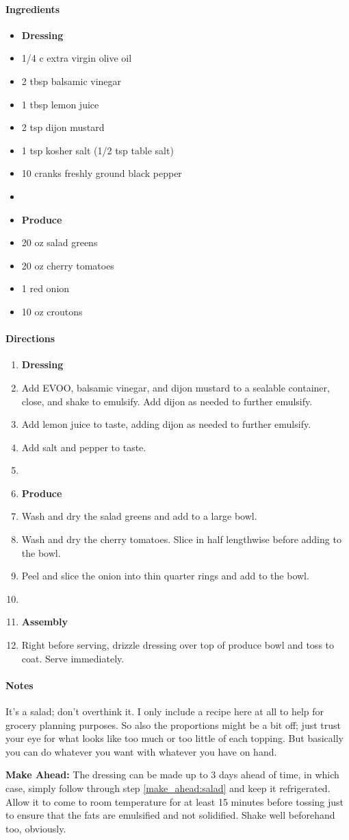 \documentclass[12pt]{article}
\newenvironment*{ingredients}
	{
		\paragraph*{Ingredients}
		\begin{itemize}
	}
	{
		\end{itemize}
	}
\newenvironment*{directions}
	{
		\paragraph*{Directions}
		\begin{enumerate}
	}
	{
		\end{enumerate}
	}
\newenvironment*{notes}
	{
		\paragraph*{Notes}
		\begin{adjustwidth}{1cm}{}
	}
	{
		\end{adjustwidth}
	}
\begin{document}
	\begin{ingredients}
		\item[] \textbf{Dressing}
		\item 1/4 c extra virgin olive oil
		\item 2 tbsp balsamic vinegar
		\item 1 tbsp lemon juice
		\item 2 tsp dijon mustard
		\item 1 tsp kosher salt (1/2 tsp table salt)
		\item 10 cranks freshly ground black pepper
		\item[] \hfill
		\item[] \textbf{Produce}
		\item 20 oz salad greens
		\item 20 oz cherry tomatoes
		\item 1 red onion
		\item 10 oz croutons
	\end{ingredients}
	
	\begin{directions}
		\item[] \textbf{Dressing}
		\item Add EVOO, balsamic vinegar, and dijon mustard to a sealable container, close, and shake to emulsify. Add dijon as needed to further emulsify.
		\item Add lemon juice to taste, adding dijon as needed to further emulsify.
		\item Add salt and pepper to taste. \label{make_ahead:salad}
		\item[] \hfill
		\item[] \textbf{Produce}
		\item Wash and dry the salad greens and add to a large bowl.
		\item Wash and dry the cherry tomatoes. Slice in half lengthwise before adding to the bowl.
		\item Peel and slice the onion into thin quarter rings and add to the bowl.
		\item[] \hfill
		\item[] \textbf{Assembly}
		\item Right before serving, drizzle dressing over top of produce bowl and toss to coat. Serve immediately.
	\end{directions}
	
	\begin{notes}
		It's a salad; don't overthink it. I only include a recipe here at all to help for grocery planning purposes. So also the proportions might be a bit off; just trust your eye for what looks like too much or too little of each topping. But basically you can do whatever you want with whatever you have on hand.
		
		\textbf{Make Ahead:} The dressing can be made up to 3 days ahead of time, in which case, simply follow through step \ref{make_ahead:salad} and keep it refrigerated. Allow it to come to room temperature for at least 15 minutes before tossing just to ensure that the fats are emulsified and not solidified. Shake well beforehand too, obviously.
	\end{notes}
	
\end{document}
